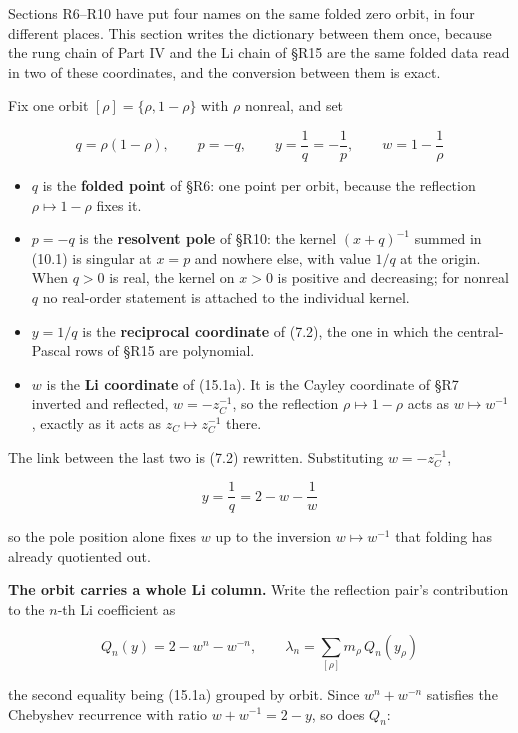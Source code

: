 \documentclass[
  11pt,
]{book}
\providecommand{\tightlist}{%
  \setlength{\itemsep}{0pt}\setlength{\parskip}{0pt}}
\begin{document}
Sections R6--R10 have put four names on the same folded zero orbit, in
four different places. This section writes the dictionary between them
once, because the rung chain of Part IV and the Li chain of §R15 are the
same folded data read in two of these coordinates, and the conversion
between them is exact.

Fix one orbit \([\rho]=\{\rho,1-\rho\}\) with \(\rho\) nonreal, and set

\[
q=\rho(1-\rho),
\qquad
p=-q,
\qquad
y=\frac1q=-\frac1p,
\qquad
w=1-\frac1\rho
\tag{10C.1}
\]

\begin{itemize}
\tightlist
\item
  \(q\) is the \textbf{folded point} of §R6: one point per orbit,
  because the reflection \(\rho\mapsto1-\rho\) fixes it.
\item
  \(p=-q\) is the \textbf{resolvent pole} of §R10: the kernel
  \((x+q)^{-1}\) summed in (10.1) is singular at \(x=p\) and nowhere
  else, with value \(1/q\) at the origin. When \(q>0\) is real, the
  kernel on \(x>0\) is positive and decreasing; for nonreal \(q\) no
  real-order statement is attached to the individual kernel.
\item
  \(y=1/q\) is the \textbf{reciprocal coordinate} of (7.2), the one in
  which the central-Pascal rows of §R15 are polynomial.
\item
  \(w\) is the \textbf{Li coordinate} of (15.1a). It is the Cayley
  coordinate of §R7 inverted and reflected, \(w=-z_C^{-1}\), so the
  reflection \(\rho\mapsto1-\rho\) acts as \(w\mapsto w^{-1}\), exactly
  as it acts as \(z_C\mapsto z_C^{-1}\) there.
\end{itemize}

The link between the last two is (7.2) rewritten. Substituting
\(w=-z_C^{-1}\),

\[
\boxed{\;y=\frac1q=2-w-\frac1w\;}
\tag{10C.2}
\]

so the pole position alone fixes \(w\) up to the inversion
\(w\mapsto w^{-1}\) that folding has already quotiented out.

\textbf{The orbit carries a whole Li column.} Write the reflection
pair's contribution to the \(n\)-th Li coefficient as

\[
Q_n(y)=2-w^n-w^{-n},
\qquad
\lambda_n=\sum_{[\rho]}m_\rho\,Q_n(y_\rho)
\tag{10C.3}
\]

the second equality being (15.1a) grouped by orbit. Since \(w^n+w^{-n}\)
satisfies the Chebyshev recurrence with ratio \(w+w^{-1}=2-y\), so does
\(Q_n\):
\end{document}
